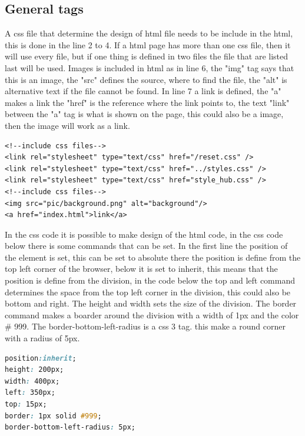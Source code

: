 \subsection{General tags}
A css file that determine the design of html file needs to be include in the html, this is done in the line 2 to 4. If a html page has more than one css file, then it will use every file, but if one thing is defined in two files the file that are listed last will be used. Images is included in html as in line 6, the "img" tag says that this is an image, the "src" defines the source, where to find the file, the "alt" is alternative text if the file cannot be found. In line 7 a link is defined, the "a" makes a link the "href" is the reference where the link points to, the text "link" between the "a" tag is what is shown on the page, this could also be a image, then the image will work as a link.
\begin{lstlisting}
<!--include css files-->
<link rel="stylesheet" type="text/css" href="/reset.css" />
<link rel="stylesheet" type="text/css" href="../styles.css" />
<link rel="stylesheet" type="text/css" href="style_hub.css" />
<!--include css files-->
<img src="pic/background.png" alt="background"/>
<a href="index.html">link</a>
\end{lstlisting}
In the css code it is possible to make design of the html code, in the css code below there is some commands that can be set. In the first line the position of the element is set, this can be set to absolute there the position is define from the top left corner of the browser, below it is set to inherit, this means that the position is define from the division, in the code below the top and left command determines the space from the top left corner in the division, this could also be bottom and right. The height and width sets the size of the division. The border command makes a boarder around the division with a width of 1px and the color \# 999. The border-bottom-left-radius is a css 3 tag. this make a round corner with a radius of 5px.
\begin{lstlisting}[language=CSS]
position:inherit;
height: 200px;
width: 400px;
left: 350px;
top: 15px;
border: 1px solid #999;
border-bottom-left-radius: 5px;
\end{lstlisting}